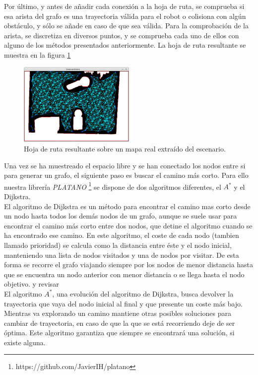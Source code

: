 Por último, y antes de añadir cada conexión a la hoja de ruta, se comprueba si esa arista del grafo es una trayectoria válida para el robot o colisiona con algún obstáculo, y sólo se añade en caso de que sea válida. Para la comprobación de la arista, se discretiza en diversos puntos, y se comprueba cada uno de ellos con alguno de los métodos presentados anteriormente. La hoja de ruta resultante se muestra en la figura \ref{fig:hoja_ruta}\\

\begin{figure}[H]
        \centering
        \includegraphics[width=0.5\textwidth]{images/roadmap.png}
        \caption{Hoja de ruta resultante sobre un mapa real extraído del escenario.}
        \label{fig:hoja_ruta}
\end{figure} 

Una vez se ha muestreado el espacio libre y se han conectado los nodos entre si para generar un grafo, el siguiente paso es buscar el camino más corto. Para ello nuestra librería \textit{PLATANO} \footnote{https://github.com/JavierIH/platano} se dispone de dos algoritmos diferentes, el $A^*$ y el Dijkstra.\\

El algoritmo de Dijkstra es un método para encontrar el camino mas corto desde un nodo hasta todos los demás nodos de un grafo, aunque se suele usar para encontrar el camino más corto entre dos nodos, que detine el algoritmo cuando se ha encontrado ese camino. En este algoritmo, el coste de cada nodo (tambien llamado prioridad) se calcula como la distancia entre éste y el nodo inicial, manteniendo una lista de nodos visitados y una de nodos por visitar. De esta forma se recorre el grafo viajando siempre por los nodos de menor distancia hasta que se encuentra un nodo anterior con menor distancia o se llega hasta el nodo objetivo. y revisar \\

El algoritmo $A^*$, una evolución del algoritmo de Dijkstra, busca devolver la trayectoria que vaya del nodo inicial al final y que presente un coste más bajo. Mientras va explorando un camino mantiene otras posibles soluciones para cambiar de trayectoria, en caso de que la que se está recorriendo deje de ser óptima. Este algoritmo garantiza que siempre se encontrará una solución, si existe alguna.\\

